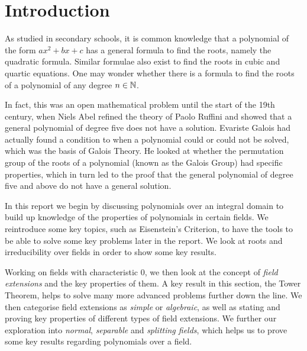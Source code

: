 
\section{Introduction}

As studied in secondary schools, it is common knowledge that a polynomial of the form $ax^2+bx+c$ has a general formula to find the roots, namely the quadratic formula. Similar formulae also exist to find the roots in cubic and quartic equations. One may wonder whether there is a formula to find the roots of a polynomial of any degree $n \in \mathbb N$.

In fact, this was an open mathematical problem until the start of the 19th century, when Niels Abel refined the theory of Paolo Ruffini and showed that a general polynomial of degree five does not have a solution. Evariste Galois had actually found a condition to when a polynomial could or could not be solved, which was the basis of Galois Theory. He looked at whether the permutation group of the roots of a polynomial (known as the Galois Group) had specific properties, which in turn led to the proof that the general polynomial of degree five and above do not have a general solution.

In this report we begin by discussing polynomials over an integral domain to build up knowledge of the properties of polynomials in certain fields. We reintroduce some key topics, such as Eisenstein’s Criterion, to have the tools to be able to solve some key problems later in the report. We look at roots and irreducibility over fields in order to show some key results.

Working on fields with characteristic $0$, we then look at the concept of \textit{field extensions} and the key properties of them. A key result in this section, the Tower Theorem, helps to solve many more advanced problems further down the line. We then categorise field extensions as \textit{simple} or \textit{algebraic}, as well as stating and proving key properties of different types of field extensions. We further our exploration into \textit{normal}, \textit{separable} and \textit{splitting fields}, which helps us to prove some key results regarding polynomials over a field.

